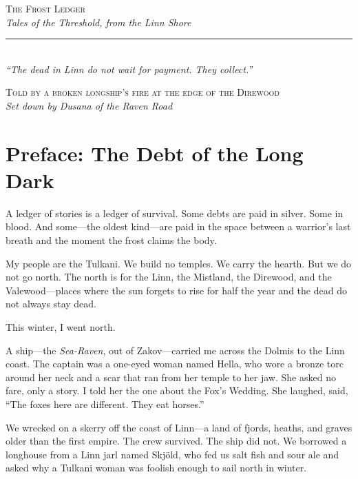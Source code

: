 \documentclass[9pt,a5paper]{extbook}
\begin{document}
\frontmatter
\thispagestyle{empty}

\begin{center}
\vspace*{1.5cm}

{\LARGE\scshape\color{frostblue} The Frost Ledger}\\[0.8cm]

{\normalsize\itshape Tales of the Threshold, from the Linn Shore}\\[1.0cm]

\rule{0.5\textwidth}{1.0pt}\\[0.8cm]

{\small\textit{``The dead in Linn do not wait for payment. They collect.''}}\\[1.5cm]

\vfill

{\footnotesize\textsc{Told by a broken longship's fire at the edge of the Direwood}\\[0.2em]
\textit{Set down by Dusana of the Raven Road}}

\end{center}

\clearpage

\section*{Preface: The Debt of the Long Dark}

A ledger of stories is a ledger of survival. Some debts are paid in silver. Some in blood. And some---the oldest kind---are paid in the space between a warrior's last breath and the moment the frost claims the body.

My people are the Tulkani. We build no temples. We carry the hearth. But we do not go north. The north is for the Linn, the Mistland, the Direwood, and the Valewood---places where the sun forgets to rise for half the year and the dead do not always stay dead.

This winter, I went north.

A ship---the \textit{Sea-Raven}, out of Zakov---carried me across the Dolmis to the Linn coast. The captain was a one-eyed woman named Hella, who wore a bronze torc around her neck and a scar that ran from her temple to her jaw. She asked no fare, only a story. I told her the one about the Fox's Wedding. She laughed, said, ``The foxes here are different. They eat horses.''

We wrecked on a skerry off the coast of Linn---a land of fjords, heaths, and graves older than the first empire. The crew survived. The ship did not. We borrowed a longhouse from a Linn jarl named Skjöld, who fed us salt fish and sour ale and asked why a Tulkani woman was foolish enough to sail north in winter.
\end{document}
